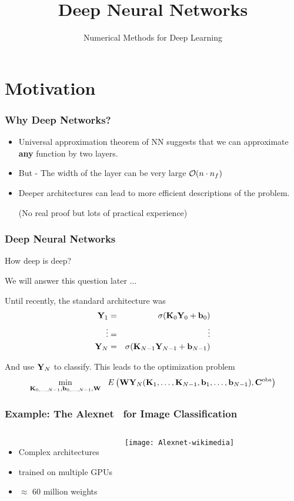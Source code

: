 \documentclass[12pt,fleqn,handout]{beamer}
\date{}
\title{Deep Neural Networks}
\subtitle{Numerical Methods for Deep Learning}
\begin{document}
\makebeamertitle

\section{Motivation} %
\label{sec:motivation}
\begin{frame}[fragile]\frametitle{Why Deep Networks?}

\begin{itemize}
\item Universal approximation theorem of NN suggests that we can approximate {\bf any} function by
two layers.
\item But - The width of the layer can be very large ${\cal O}(n\cdot n_f)$
\item
Deeper architectures can lead to more efficient descriptions of the problem.

(No real proof but lots of practical experience)
\end{itemize}


\end{frame}

\begin{frame}[fragile]\frametitle{Deep Neural Networks}

How deep is deep?

We will answer this question later ...

\bigskip
\pause

Until recently, the standard architecture was
\begin{eqnarray*}
{\bf Y}_1 &=& \sigma({\bf K}_0{\bf Y}_0 + {\bf b}_0) \\
\vdots & =&  \vdots \\
 {\bf Y}_N &=& \sigma({\bf K}_{N-1}  {\bf Y}_{N-1}+ {\bf b}_{N-1})
 \end{eqnarray*}

\bigskip
\pause

And use ${\bf Y}_N$ to classify. This leads to the optimization problem
$$ 
\min_{{\bf K}_{0,\ldots,N-1},{\bf b}_{0,\ldots,N-1},{\bf W}} \ \ E\left({\bf W} {\bf Y}_N({\bf K}_1,\ldots,{\bf K}_{N-1},{\bf b}_1,\ldots, {\bf b}_{N-1}) , {\bf C}^{\rm obs} \right)
 $$

\end{frame}

\begin{frame}[fragile]\frametitle{Example: The Alexnet~\cite{KrizhevskySutskeverHinton2012} for Image Classification}

\begin{columns}
	\begin{itemize}
		\item Complex architectures 
		\item trained on multiple GPUs
		\item $\approx $ 60 million weights
	\end{itemize}	
\begin{center}
\texttt{[image: Alexnet-wikimedia]}
\end{center}
\end{columns}




\end{frame}
\end{document}
